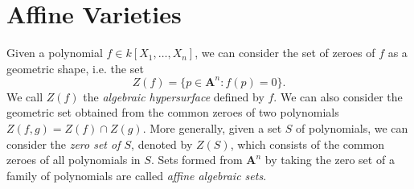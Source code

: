 \section{Affine Varieties}

Given a polynomial $f \in k[X_1, \dots, X_n]$, we can consider the set of zeroes of $f$ as a geometric shape, i.e. the set
%
\[ Z(f) = \{ p \in \mathbf{A}^n : f(p) = 0 \}. \]
%
We call $Z(f)$ the \emph{algebraic hypersurface} defined by $f$. We can also consider the geometric set obtained from the common zeroes of two polynomials $Z(f,g) = Z(f) \cap Z(g)$. More generally, given a set $S$ of polynomials, we can consider the \emph{zero set of $S$}, denoted by $Z(S)$, which consists of the common zeroes of all polynomials in $S$. Sets formed from $\mathbf{A}^n$ by taking the zero set of a family of polynomials are called \emph{affine algebraic sets}.




